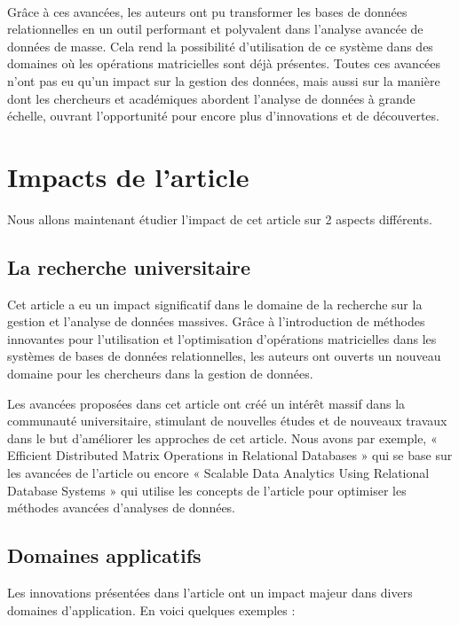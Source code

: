 \documentclass[a4paper, 12pt]{article}
\begin{document}
\paragraph{}
Grâce à ces avancées, les auteurs ont pu transformer les bases de données relationnelles en un outil performant et polyvalent dans l'analyse avancée de données de masse. Cela rend la possibilité d'utilisation de ce système dans des domaines où les opérations matricielles sont déjà présentes. Toutes ces avancées n'ont pas eu qu'un impact sur la gestion des données, mais aussi sur la manière dont les chercheurs et académiques abordent l'analyse de données à grande échelle, ouvrant l'opportunité pour encore plus d'innovations et de découvertes.

\clearpage 
\section{Impacts de l'article}

Nous allons maintenant étudier l’impact de cet article sur 2 aspects différents. 

\subsection{La recherche universitaire}

Cet article a eu un impact significatif dans le domaine de la recherche sur la gestion et l'analyse de données massives. Grâce à l'introduction de méthodes innovantes pour l'utilisation et l'optimisation d'opérations matricielles dans les systèmes de bases de données relationnelles, les auteurs ont ouverts un nouveau domaine pour les chercheurs dans la gestion de données.

Les avancées proposées dans cet article ont créé un intérêt massif dans la communauté universitaire, stimulant de nouvelles études et de nouveaux travaux dans le but d'améliorer les approches de cet article. Nous avons par exemple, « Efficient Distributed Matrix Operations in Relational Databases » qui se base sur les avancées de l’article ou encore « Scalable Data Analytics Using Relational Database Systems » qui utilise les concepts de l’article pour optimiser les méthodes avancées d’analyses de données.

\subsection{Domaines applicatifs}

Les innovations présentées dans l'article ont un impact majeur dans divers domaines d'application. En voici quelques exemples : 
\end{document}
